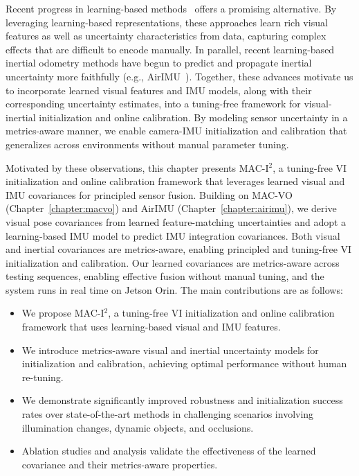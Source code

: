 Recent progress in learning-based methods~\cite{qiu2025mac, qiu2023airimu} offers a promising alternative.
By leveraging learning-based representations, these approaches learn rich visual features as well as uncertainty characteristics from data, capturing complex effects that are difficult to encode manually.
In parallel, recent learning-based inertial odometry methods have begun to predict and propagate inertial uncertainty more faithfully (e.g., AirIMU~\cite{qiu2023airimu}).
Together, these advances motivate us to incorporate learned visual features and IMU models, along with their corresponding uncertainty estimates, into a tuning-free framework for visual-inertial initialization and online calibration.
By modeling sensor uncertainty in a metrics-aware manner, we enable camera-IMU initialization and calibration that generalizes across environments without manual parameter tuning.

Motivated by these observations, this chapter presents MAC-I$^2$, a tuning-free VI initialization and online calibration framework that leverages learned visual and IMU covariances for principled sensor fusion. 
Building on MAC-VO (Chapter~\ref{chapter:macvo}) and AirIMU (Chapter~\ref{chapter:airimu}), we derive visual pose covariances from learned feature-matching uncertainties and adopt a learning-based IMU model to predict IMU integration covariances. Both visual and inertial covariances are metrics-aware, enabling principled and tuning-free VI initialization and calibration.
Our learned covariances are metrics-aware across testing sequences, enabling effective fusion without manual tuning, and the system runs in real time on Jetson Orin.
The main contributions are as follows:
\begin{itemize}
    \item We propose MAC-I$^2$, a tuning-free VI initialization and online calibration framework that uses learning-based visual and IMU features.
    
    \item We introduce metrics-aware visual and inertial uncertainty models for initialization and calibration, achieving optimal performance without human re-tuning.
    
    \item We demonstrate significantly improved robustness and initialization success rates over state-of-the-art methods in challenging scenarios involving illumination changes, dynamic objects, and occlusions.
    
    \item Ablation studies and analysis validate the effectiveness of the learned covariance and their metrics-aware properties.
\end{itemize}


